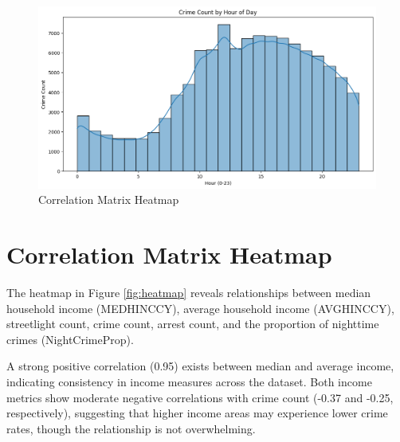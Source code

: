 \documentclass{report}
\begin{document}
     \begin{figure}[ht]
    	\begin{center}
    		\advance\leftskip-3cm
    		\advance\rightskip-3cm
    		\includegraphics[keepaspectratio=true,scale=.6]{crime-by-hour}
    		\caption{Correlation Matrix Heatmap}
    		\label{fig:crime-by-hour}
    	\end{center}
    \end{figure}
    
    \newpage
    \section{Correlation Matrix Heatmap}
    \par The heatmap in Figure \ref{fig:heatmap} reveals relationships between median household income (MEDHINC\textunderscore CY), average household income (AVGHINC\textunderscore CY), streetlight count, crime count, arrest count, and the proportion of nighttime crimes (Night\textunderscore Crime\textunderscore Prop). 
    
    A strong positive correlation (0.95) exists between median and average income, indicating consistency in income measures across the dataset. Both income metrics show moderate negative correlations with crime count (-0.37 and -0.25, respectively), suggesting that higher income areas may experience lower crime rates, though the relationship is not overwhelming. 
    
\end{document}
